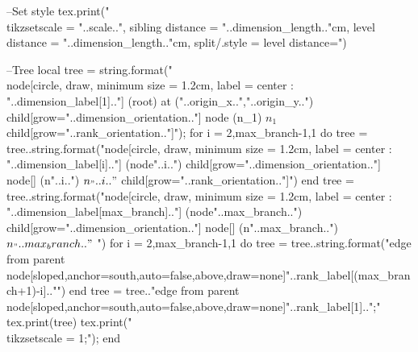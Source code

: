 \begin{luacode*}
	  --Set style
	  tex.print("\\tikzset{scale = "..scale..", sibling distance = "..dimension_length.."cm, level distance = "..dimension_length.."cm, split/.style = {level distance=}}")
	  
	  --Tree
	  local tree = string.format("\\node[circle, draw, minimum size = 1.2cm, label = center : "..dimension_label[1].."] (root) at ("..origin_x..","..origin_y..") {} child[grow="..dimension_orientation.."] {node (n_1) {$n_1$}} child[grow="..rank_orientation.."]{");
	  for i = 2,max_branch-1,1 do
		tree = tree..string.format("node[circle, draw, minimum size = 1.2cm, label = center : "..dimension_label[i].."] (node"..i..") {} child[grow="..dimension_orientation.."] {node[] (n"..i..") {$n_"..i.."$}} child[grow="..rank_orientation.."]{")
	  end
	  tree = tree..string.format("node[circle, draw, minimum size = 1.2cm, label = center : "..dimension_label[max_branch].."] (node"..max_branch..") {} child[grow="..dimension_orientation.."] {node[] (n"..max_branch..") {$n_"..max_branch.."$} }")
	  for i = 2,max_branch-1,1 do
		tree = tree..string.format("edge from parent node[sloped,anchor=south,auto=false,above,draw=none]{"..rank_label[(max_branch+1)-i].."}}")
	  end
	  tree = tree.."edge from parent node[sloped,anchor=south,auto=false,above,draw=none]{"..rank_label[1].."}};"
	  tex.print(tree)
	  tex.print("\\tikzset{scale = 1};");
	end


\end{luacode*}
